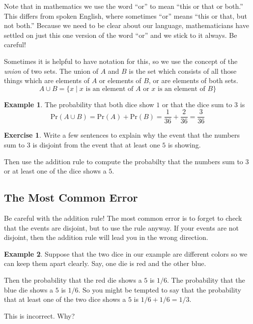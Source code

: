\documentclass[12pt,letterpaper]{article}
\theoremstyle{definition}
\newtheorem{example}{Example}
\newtheorem{exercise}[question]{Exercise}
\begin{document}
Note that in mathematics we use the word ``or'' to mean ``this or that or both.''
This differs from spoken English, where sometimes ``or'' means ``this or that, but not both.'' 
Because we need to be clear about our language, mathematicians have settled on just this one version of the word ``or'' and we stick to it always.
Be careful!

Sometimes it is helpful to have notation for this, so we use the concept of the \emph{union} of two sets.
The union of $A$ and $B$ is the set which consists of all those things which are elements of $A$ or elements of $B$, or are elements of both sets.
\[
A \cup B = \{ x \mid \text{$x$ is an element of $A$ or $x$ is an element of $B$} \}
\]

\begin{example}
The probability that both dice show $1$ or that the dice sum to $3$ is 
\[
\mathrm{Pr}(A\cup B) = \mathrm{Pr}(A) + \mathrm{Pr}(B) = \dfrac{1}{36} + \dfrac{2}{36} = \dfrac{3}{36}
\]
\end{example}


\begin{exercise}
Write a few sentences to explain why the event that the numbers sum to $3$ is disjoint from the event that at least one $5$ is showing.

Then use the addition rule to compute the probabilty that the numbers sum to $3$ or at least one of the dice shows a $5$.
\end{exercise}


\subsection*{The Most Common Error}

Be careful with the addition rule!
The most common error is to forget to check that the events are disjoint, but to use the rule anyway.
If your events are not disjoint, then the addition rule will lead you in the wrong direction.

\begin{example}
Suppose that the two dice in our example are different colors so we can keep them apart clearly. Say, one die is red and the other blue.

Then the probability that the red die shows a $5$ is $1/6$.
The probability that the blue die shows a $5$ is $1/6$.
So you might be tempted to say that the probability that at least one of the two dice shows a $5$ is $1/6 + 1/6 = 1/3$.

This is incorrect. 
Why?
\end{example}
\end{document}
